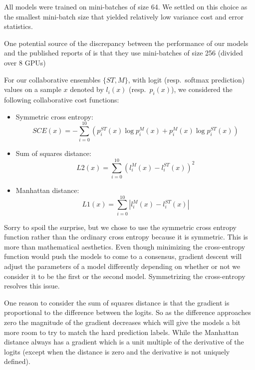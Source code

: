 \documentclass[english,a4paper,oneside]{amsart}
\theoremstyle{definition}
\begin{document}
All models were trained on mini-batches of size 64. We settled on this choice as the smallest mini-batch size that yielded relatively low variance cost and error statistics. 
\begin{remark}
	One potential source of the discrepancy between the performance of our models and the published reports of \cite{ResNet} is that they use mini-batches of size 256 (divided over 8 GPUs)
\end{remark}

For our collaborative ensembles $\{ST, M\}$, with logit (resp.~softmax prediction) values on a sample $x$ denoted by $l_i(x)$ (resp.~$p_i(x)$), we considered the following collaborative cost functions: 
\begin{itemize}
	\item Symmetric cross entropy: \[SCE(x)=-\sum_{i=0}^{10} (p_i^{ST}(x) \log p_i^M(x) + p_i^{M}(x)\log p_i^{ST}(x))\]
	\item Sum of squares distance: \[ L2(x)= \sum_{i=0}^{10} (l_i^M(x)-l_i^{ST}(x))^2\]
	\item Manhattan distance: \[ L1(x)= \sum_{i=0}^{10} |l_i^M(x)-l_i^{ST}(x)|\]
\end{itemize}
Sorry to spoil the surprise, but we chose to use the symmetric cross entropy function rather than the ordinary cross entropy because it is symmetric. This is more than mathematical aesthetics. Even though minimizing the cross-entropy function would push the models to come to a consensus, gradient descent will adjust the parameters of a model differently depending on whether or not we consider it to be the first or the second model. Symmetrizing the cross-entropy resolves this issue.

One reason to consider the sum of squares distance is that the gradient is proportional to the difference between the logits. So as the difference approaches zero the magnitude of the gradient decreases which will give the models a bit more room to try to match the hard prediction labels. While the Manhattan distance always has a gradient which is a unit multiple of the derivative of the logits (except when the distance is zero and the derivative is not uniquely defined).
\end{document}
